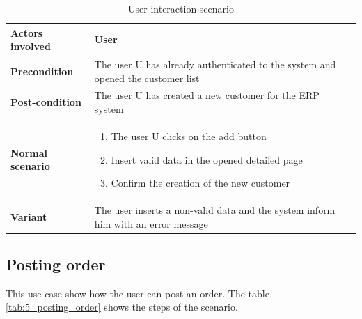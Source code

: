 \begin{table}
    \centering
    \begin{tabular}{|l|p{10cm}|}
        \hline
        \textbf{Actors involved} & User                                                                              \\
        \hline
        \textbf{Precondition}    & The user U has already authenticated to the system and opened the customer list   \\
        \hline
        \textbf{Post-condition}  & The user U has created a new customer for the ERP system                          \\
        \hline
        \textbf{Normal scenario} &
        \begin{enumerate}
            \item The user U clicks on the add button
            \item Insert valid data in the opened detailed page
            \item Confirm the creation of the new customer
        \end{enumerate}                                                           \\
        \hline
        \textbf{Variant}         & The user inserts a non-valid data and the system inform him with an error message \\
        \hline
    \end{tabular}
    \caption{User interaction scenario}
    \label{tab:5_user_interaction}
\end{table}


\subsection{Posting order}
This use case show how the user can post an order. The table \ref{tab:5_posting_order} shows the
steps of the scenario.

